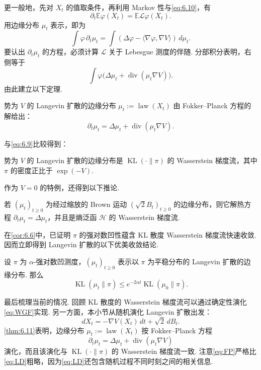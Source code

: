 更一般地，先对 $X_t$ 的值取条件，再利用 Markov 性与\eqref{eq:6.10}，有
$$
\partial_t\mathbb E\varphi(X_t)=\mathbb E\mathcal L\varphi(X_t).
$$
用边缘分布 $\mu_t$ 表示，即为
$$
\int\varphi\,\partial_t\mu_t=\int(\Delta\varphi-\langle\nabla\varphi,\nabla V\rangle)\,d\mu_t.
$$
要认出 $\partial_t\mu_t$ 的方程，必须计算 $\mathcal L$ 关于 Lebesgue 测度的伴随. 分部积分表明，右侧等于
$$
\int\varphi\bigl(\Delta\mu_t+\operatorname{div}(\mu_t\nabla V)\bigr).
$$
由此建立以下定理.

\begin{theorem}\label{thm:6.11}
势为 $V$ 的 Langevin 扩散的边缘分布 $\mu_t:=\operatorname{law}(X_t)$ 由 Fokker--Planck 方程的解给出：
$$
\partial_t\mu_t=\Delta\mu_t+\operatorname{div}(\mu_t\nabla V).
$$
\end{theorem}

与\eqref{eq:6.9}比较得到：

\begin{corollary}\label{cor:6.12}
势为 $V$ 的 Langevin 扩散的边缘分布是 $\operatorname{KL}(\cdot\|\pi)$ 的 Wasserstein 梯度流，其中 $\pi$ 的密度正比于 $\exp(-V)$.
\end{corollary}

作为 $V=0$ 的特例，还得到以下推论.

\begin{corollary}\label{cor:6.13}
若 $(\mu_t)_{t\geq0}$ 为经过缩放的 Brown 运动 $(\sqrt2B_t)_{t\geq0}$ 的边缘分布，则它解热方程 $\partial_t\mu_t=\Delta\mu_t$，并且是熵泛函 $\mathcal H$ 的 Wasserstein 梯度流.
\end{corollary}

在\autoref{cor:6.6}中，已证明 $\pi$ 的强对数凹性蕴含 KL 散度 Wasserstein 梯度流快速收敛. 因而立即得到 Langevin 扩散的以下优美收敛结论.

\begin{corollary}\label{cor:6.14}
设 $\pi$ 为 $\alpha$-强对数凹测度，$(\mu_t)_{t\geq0}$ 表示以 $\pi$ 为平稳分布的 Langevin 扩散的边缘分布. 那么
$$
\operatorname{KL}(\mu_t\|\pi)\leq e^{-2\alpha t}\operatorname{KL}(\mu_0\|\pi).
$$
\end{corollary}

最后梳理当前的情况. 回顾 KL 散度的 Wasserstein 梯度流可以通过确定性演化\eqref{eq:WGF}实现. 另一方面，本小节从随机演化 Langevin 扩散出发：
\begin{equation}\tag{LD}\label{eq:LD}
dX_t=-\nabla V(X_t)\,dt+\sqrt2\,dB_t.
\end{equation}
\autoref{thm:6.11}表明，边缘分布 $\mu_t:=\operatorname{law}(X_t)$ 按 Fokker--Planck 方程
\begin{equation}\tag{FP}\label{eq:FP}
\partial_t\mu_t=\Delta\mu_t+\operatorname{div}(\mu_t\nabla V)
\end{equation}
演化，而且该演化与 $\operatorname{KL}(\cdot\|\pi)$ 的 Wasserstein 梯度流一致. 注意\eqref{eq:FP}严格比\eqref{eq:LD}粗略，因为\eqref{eq:LD}还包含随机过程不同时刻之间的相关信息.


